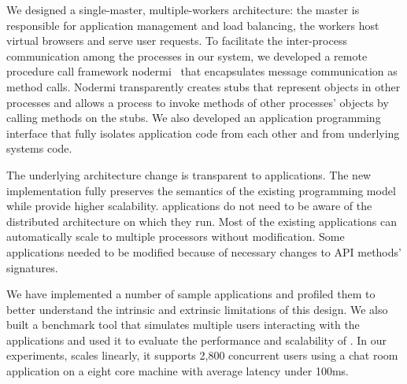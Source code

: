 We designed a single-master, multiple-workers architecture:
the master is responsible for application management and load balancing,
the workers host virtual browsers and serve user requests.
To facilitate the inter-process
communication among the processes in our system, we developed a remote procedure call
framework nodermi~\cite{nodermi} that encapsulates message communication as
method calls.
Nodermi transparently creates stubs that represent objects in other processes
and allows a process to invoke methods of other processes' objects by calling
methods on the stubs.
We also developed an application programming interface that fully
isolates application code from each other and from underlying systems code.

The underlying architecture change is transparent to applications. The new
implementation fully preserves the semantics of the existing programming model
while provide higher scalability. \cb{} applications do not need to be aware of
the distributed architecture on which they run.  Most of the existing applications 
can automatically scale to multiple processors without modification. Some
applications needed to be modified because of necessary changes to API methods'
signatures.

We have implemented a number of sample applications and profiled them to
better understand the intrinsic and extrinsic limitations of this design.  We
also built a benchmark tool that simulates multiple users interacting with the
applications and used it to evaluate the performance and scalability of
\cbtwo. In our experiments,  \cbtwo scales linearly, it supports 2,800
concurrent users using a chat room application on a eight core machine with
average latency under 100ms.

